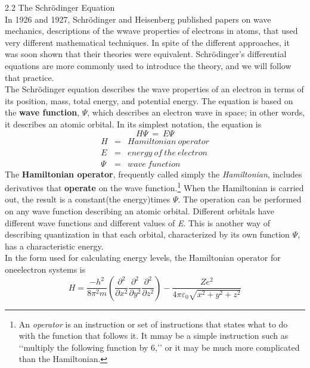 \documentclass{article}
\begin{document}
{\flushleft \large \textsf{{\LARGE{2.2}} The Schr\"odinger Equation}}\\
In 1926 and 1927, Schr\"odinger and Heisenberg published
 papers on wave mechan\-ics, descriptions of the wwave properties of
 electrons in atoms, that used very different mathematical techniques.
 In spite of the different approaches, it was soon shown that their
 theories were equivalent. Schr\"odinger's differential equations are
 more commonly used to introduce the theory, and we will follow that
 practice.\\
\fussy The Schr\"odinger equation describes the wave properties of an
 electron in terms of its position, mass, total energy, and potential
 energy. The equation is based on the \textbf{wave function}, $\Psi$,
 which describes an electron wave in space; in other words, it describes
 an atomic orbital. In its simplest notation, the equation is
\begin{displaymath}
{H\Psi~=~E\Psi}
\end{displaymath}
\begin{eqnarray}
H & = & Hamiltonian~operator    \\[6pt]
E & = & energy~of~the~electron  \\[6pt]
\Psi & = & wave~function
\end{eqnarray}
\fussy The \textbf{Hamiltonian operator}, frequently called simply the
 \emph{Hamiltonian}, includes deriva\-tives that \textbf{operate} on the
 wave function.\footnote{{An \emph{operator} is an instruction or set of
 instructions that states what to do with the function that follows it.
 It mmay be a simple instruction such as ‘‘multiply the following
 function by 6,’’ or it may be much more complicated than the
 Hamiltonian.}} When the Hamiltonian is carried out, the result is a
 constant(the energy)times $\Psi$. The operation can be performed on any
 wave function describing an atomic orbital. Different orbitals have
 different wave functions and different values of \emph{E}. This is
 another way of describing quantization in that each orbital,
 characterized by its own function $\Psi$, has a characteristic energy.\\
In the form used for calculating energy levels, the Hamiltonian operator
 for one\-electron systems is
\begin{displaymath}
{H = \frac{-h^{2}}{8\pi^{2}m}
\left(
\frac{\partial^{2}}{{\partial}x^{2}}
\frac{\partial^{2}}{{\partial}y^{2}}
\frac{\partial^{2}}{{\partial}z^{2}}
\right)}-\frac{Ze^{2}}{4\pi\varepsilon_{0}\sqrt{x^{2}+y^{2}+z^{2}}}
\end{displaymath}
\end{document}
